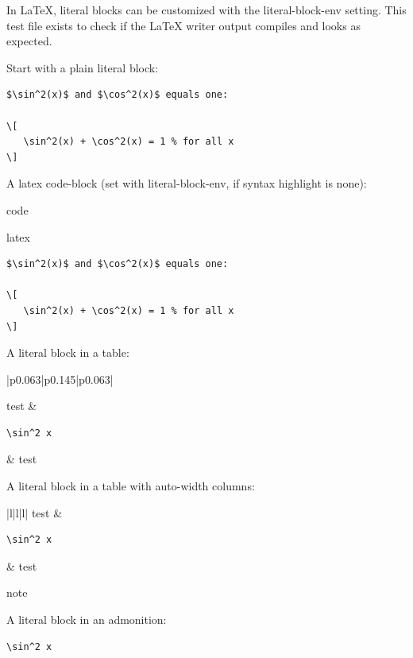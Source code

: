 \documentclass[a4paper]{article}
\newlength{\DUtablewidth} %
\newlength{\ttemwidth}
\begin{document}
In LaTeX, literal blocks can be customized with the \textquotedbl{}literal-block-env\textquotedbl{}
setting. This test file exists to check if the LaTeX writer output compiles
and looks as expected.

Start with a plain literal block:

\begin{lstlisting}
$\sin^2(x)$ and $\cos^2(x)$ equals one:

\[
   \sin^2(x) + \cos^2(x) = 1 % for all x
\]
\end{lstlisting}

A latex \textquotedbl{}code-block\textquotedbl{} (set with \textquotedbl{}literal-block-env\textquotedbl{}, if syntax
highlight is \textquotedbl{}none\textquotedbl{}):

\begin{DUclass}{code}
\begin{DUclass}{latex}
\begin{lstlisting}
$\sin^2(x)$ and $\cos^2(x)$ equals one:

\[
   \sin^2(x) + \cos^2(x) = 1 % for all x
\]
\end{lstlisting}
\end{DUclass}
\end{DUclass}

A literal block in a table:

\setlength{\DUtablewidth}{\linewidth}%
\begin{longtable*}{|p{0.063\DUtablewidth}|p{0.145\DUtablewidth}|p{0.063\DUtablewidth}|}
\hline

test
 & 
\begin{minipage}{8\ttemwidth}
\lstset{xleftmargin=0pt}
\begin{lstlisting}
\sin^2 x
\end{lstlisting}
\end{minipage}
 & 
test
 \\
\hline
\end{longtable*}

A literal block in a table with auto-width columns:

\begin{longtable*}{|l|l|l|}
\hline
test & 
\lstset{xleftmargin=0pt}
\begin{lstlisting}
\sin^2 x
\end{lstlisting}
 & test \\
\hline
\end{longtable*}

\begin{DUclass}{note}
\begin{DUadmonition}

A literal block in an admonition:

\begin{lstlisting}
\sin^2 x
\end{lstlisting}
\end{DUadmonition}
\end{DUclass}
\end{document}
